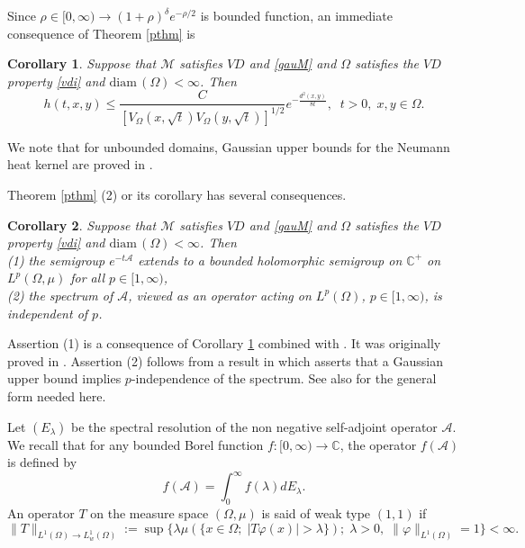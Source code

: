 \documentclass[10pt]{amsart}
\newtheorem{corollary}{Corollary}
\theoremstyle{definition}
\begin{document}
Since $\rho \in [0,\infty )\rightarrow (1+\rho )^\delta e^{-\rho /2}$ is bounded function, an immediate consequence of Theorem \ref{pthm} is

\begin{corollary}\label{gub}
Suppose that $\mathcal{M}$ satisfies $VD$ and \eqref{gauM} and $\Omega$ satisfies the $VD$ property \eqref{vdi} and $\textrm{diam}\, (\Omega )<\infty$.  Then 
\[
h(t,x,y)\leq \frac{C}{\left[V_\Omega (x,\sqrt{t})V_\Omega (y,\sqrt{t})\right]^{1/2}}e^{-\frac{d^2(x,y)}{8t}},\;\; t>0,\; x,y\in \Omega .
\]
\end{corollary}

We note that for unbounded domains, Gaussian upper bounds for the Neumann heat kernel are proved in \cite{GS}.

\smallskip
Theorem \ref{pthm} (2) or its corollary has several consequences.

\begin{corollary}\label{ana}
Suppose that $\mathcal{M}$ satisfies $VD$ and \eqref{gauM} and $\Omega$ satisfies the $VD$ property \eqref{vdi} and $\textrm{diam}\, (\Omega )<\infty$. Then\\
(1) the semigroup $e^{-t\mathcal{A}}$ extends to a bounded holomorphic semigroup on $\mathbb{C}^+$ 
on $L^p(\Omega ,\mu )$ for all $p \in [1, \infty)$,
\\
(2) the spectrum of $\mathcal{A}$, viewed as an operator acting on $L^p(\Omega )$, $p\in [1, \infty )$, is independent of $p$.
\end{corollary}

Assertion (1) is a consequence of Corollary \ref{gub} combined with \cite[Corollary 7.5, page 202]{Ou}. It was originally proved in \cite{Ou95}. Assertion (2)  follows from a result in \cite{Dav} which asserts that a Gaussian upper bound implies $p$-independence  of the spectrum. See also  \cite[Theorem 7.10, page 206]{Ou} for the general form needed here. 

\smallskip
Let $(E_\lambda )$ be the spectral resolution of the non negative self-adjoint operator $\mathcal{A}$. We recall that for any bounded Borel function $f: [0,\infty )\rightarrow \mathbb{C}$, the operator $f(\mathcal{A})$ is defined by
\[
f(\mathcal{A})=\int _0^\infty f(\lambda )dE_\lambda .
\]
An operator $T$ on the measure space $(\Omega ,\mu)$ is said of weak type $(1,1)$ if
\[
\|T\|_{L^1(\Omega )\rightarrow L^1_w(\Omega )}:=\sup \{\lambda \mu (\{x\in \Omega ;\; |T\varphi (x)|>\lambda \});\; \lambda >0,\; \|\varphi \|_{L^1(\Omega )}=1\}<\infty .
\]
\end{document}
